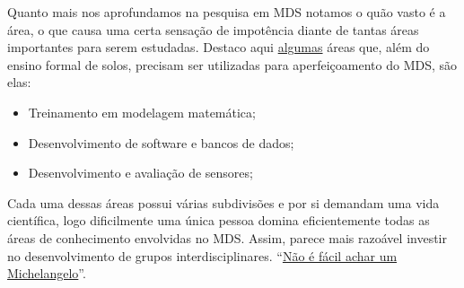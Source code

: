 Quanto mais nos aprofundamos na pesquisa em MDS notamos o quão vasto é a área, o que causa uma certa sensação de impotência diante de tantas áreas importantes para serem estudadas. Destaco aqui \underline{algumas} áreas que, além do ensino formal de solos, precisam ser utilizadas para aperfeiçoamento do MDS, são elas:
\begin{itemize}
\item Treinamento em modelagem matemática;
\item Desenvolvimento de software e bancos de dados;
\item Desenvolvimento e avaliação de sensores;
\end{itemize}
Cada uma dessas áreas possui várias subdivisões e por si demandam uma vida científica, logo dificilmente uma única pessoa domina eficientemente todas as áreas de conhecimento envolvidas no MDS. Assim, parece mais razoável investir no desenvolvimento de grupos interdisciplinares. ``\underline{Não é fácil achar um Michelangelo}''.
